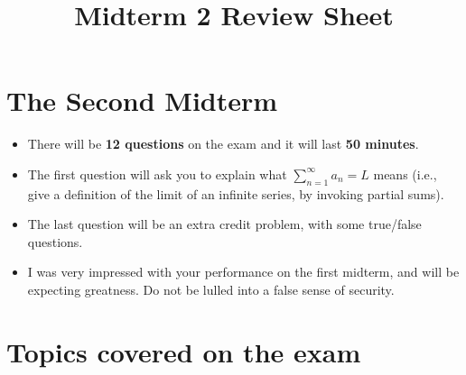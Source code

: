 \documentclass[12pt]{article}
\title{Midterm 2 Review Sheet}
\theoremstyle{definition}
\begin{document}
\section*{The Second Midterm}

\begin{itemize}
\item There will be \textbf{12 questions} on the exam and it will last
  \textbf{50 minutes}.

\item The first question will ask you to explain what
  $\displaystyle\sum_{n=1}^\infty a_n = L$ means (i.e., give a
  definition of the limit of an infinite series, by invoking partial
  sums).

\item The last question will be an extra credit problem, with some
  true/false questions.

\item I was very impressed with your performance on the first midterm,
  and will be expecting greatness.  Do not be lulled into a false
  sense of security.

\end{itemize}

\section*{Topics covered on the exam}
\end{document}
